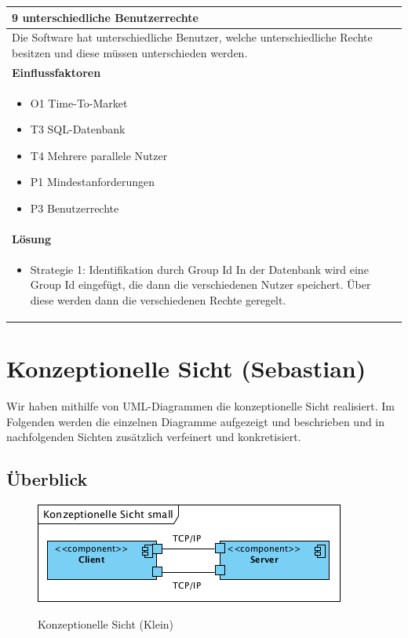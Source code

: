 \documentclass[fontsize=12pt,paper=a4,twoside]{scrartcl}
\begin{document}
\begin{table}[H]
\begin{tabular}{|p{\textwidth}|}\hline
9 unterschiedliche Benutzerrechte\\ \hline
Die Software hat unterschiedliche Benutzer, welche unterschiedliche Rechte besitzen und diese müssen unterschieden werden.\\ \hline
\textbf{Einflussfaktoren}\\
\begin{itemize}
\item O1 Time-To-Market
\item T3 SQL-Datenbank
\item T4 Mehrere parallele Nutzer
\item P1 Mindestanforderungen
\item P3 Benutzerrechte
\end{itemize}\\ \hline
\textbf{Lösung}\\
\begin{itemize}
\item Strategie 1: Identifikation durch Group Id \leavevmode\newline
In der Datenbank wird eine Group Id eingefügt, die dann die verschiedenen Nutzer speichert. Über diese werden dann die verschiedenen Rechte geregelt.
\end{itemize} \\ \hline
\end{tabular}
\end{table}

\newpage

\section{Konzeptionelle Sicht (Sebastian)}
\label{sec:konzeptionell}

Wir haben mithilfe von UML-Diagrammen die konzeptionelle Sicht realisiert. Im Folgenden werden die einzelnen Diagramme aufgezeigt und beschrieben und in nachfolgenden Sichten zusätzlich verfeinert und konkretisiert.

\subsection{Überblick}
\label{Ueberblick}

\begin{figure} [H] 
\caption{Konzeptionelle Sicht (Klein)} \centering
	\includegraphics[scale=2]{Diagramme/KonzeptionelleSichtKlein.png} 
	\label{pic:konzeptionellesichtklein} 
\end{figure}
\end{document}
